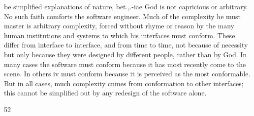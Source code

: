 \documentclass[12pt]{article}
\begin{document}
be simplified explanations of nature, bet.,.-iae God is not capricious or arbitrary.
No such faith comforts the software engineer. Much of the complexity he must master
is arbitrary complexity, forced without rhyme or reason by the many human institutions
and systems to which his interfaces must conform. These differ from interface to interface,
and from time to time, not because of necessity but only because they were designed by
different people, rather than by God.
In many cases the software must conform because it has most recently come to the
scene. In others iv must conform because it is perceived as the most conformable. But
in all cases, much complexity cnmes from conformation to other interfaces; this cannot be
simplified out by any redesign of the software alone.

52
\end{document}
